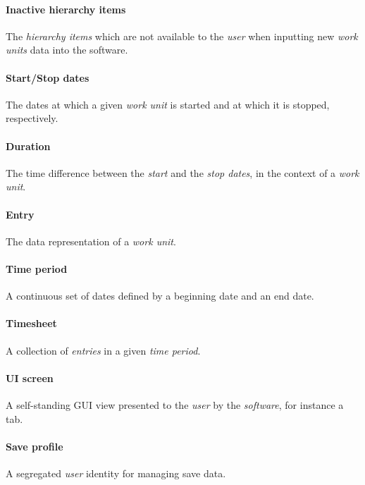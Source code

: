 \paragraph{Inactive hierarchy items} The \emph{hierarchy items} which are
  not available to the \emph{user} when inputting new \emph{work units}
  data into the software.
\paragraph{Start/Stop dates} The dates at which a given \emph{work unit} is
  started and at which it is stopped, respectively.
\paragraph{Duration} The time difference between the \emph{start} and the
  \emph{stop dates}, in the context of a \emph{work unit}.
\paragraph{Entry} The data representation of a \emph{work unit}.
\paragraph{Time period} A continuous set of dates defined by a beginning
  date and an end date.
\paragraph{Timesheet} A collection of \emph{entries} in a given \emph{time
  period}.
\paragraph{\gls{UI} screen} A self-standing \gls{GUI} view presented to the
\emph{user} by the \emph{software}, for instance a tab.
\paragraph{Save profile} A segregated \emph{user} identity for managing save data.
